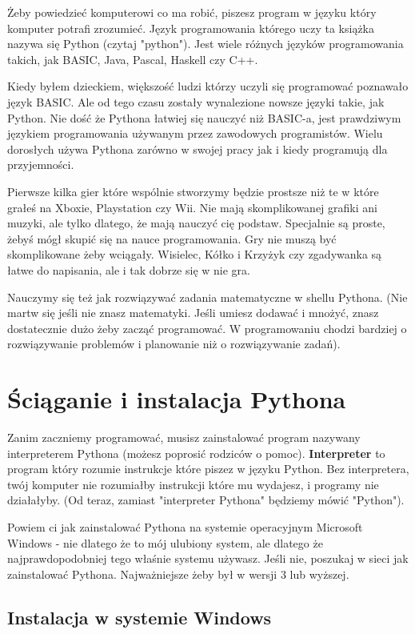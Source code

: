 \documentclass{book}
\begin{document}
Żeby powiedzieć komputerowi co ma robić, piszesz program w języku który komputer potrafi zrozumieć. Język programowania którego uczy ta książka nazywa się Python (czytaj "python"). Jest wiele różnych języków programowania takich, jak BASIC, Java, Pascal, Haskell czy C++.

Kiedy byłem dzieckiem, większość ludzi którzy uczyli się programować poznawało język BASIC. Ale od tego czasu zostały wynalezione nowsze języki takie, jak Python. Nie dość że Pythona łatwiej się nauczyć niż BASIC-a, jest prawdziwym językiem programowania używanym przez zawodowych programistów. Wielu dorosłych używa Pythona zarówno w swojej pracy jak i kiedy programują dla przyjemności.

Pierwsze kilka gier które wspólnie stworzymy będzie prostsze niż te w które grałeś na Xboxie, Playstation czy Wii. Nie mają skomplikowanej grafiki ani muzyki, ale tylko dlatego, że mają nauczyć cię podstaw. Specjalnie są proste, żebyś mógł skupić się na nauce programowania. Gry nie muszą być skomplikowane żeby wciągały. Wisielec, Kółko i Krzyżyk czy zgadywanka są łatwe do napisania, ale i tak dobrze się w nie gra.

Nauczymy się też jak rozwiązywać zadania matematyczne w shellu Pythona. (Nie martw się jeśli nie znasz matematyki. Jeśli umiesz dodawać i mnożyć, znasz dostatecznie dużo żeby zacząć programować. W programowaniu chodzi bardziej o rozwiązywanie problemów i planowanie niż o rozwiązywanie zadań).

\section{Ściąganie i instalacja Pythona}

Zanim zaczniemy programować, musisz zainstalować program nazywany interpreterem Pythona (możesz poprosić rodziców o pomoc). {\bf Interpreter} to program który rozumie instrukcje które piszez w języku Python. Bez interpretera, twój komputer nie rozumiałby instrukcji które mu wydajesz, i programy nie działałyby. (Od teraz, zamiast "interpreter Pythona" będziemy mówić "Python").

Powiem ci jak zainstalować Pythona na systemie operacyjnym Microsoft Windows - nie dlatego że to mój ulubiony system, ale dlatego że najprawdopodobniej tego właśnie systemu używasz. Jeśli nie, poszukaj w sieci jak zainstalować Pythona. Najważniejsze żeby był w wersji 3 lub wyższej.


\subsection{Instalacja w systemie Windows}
\end{document}
